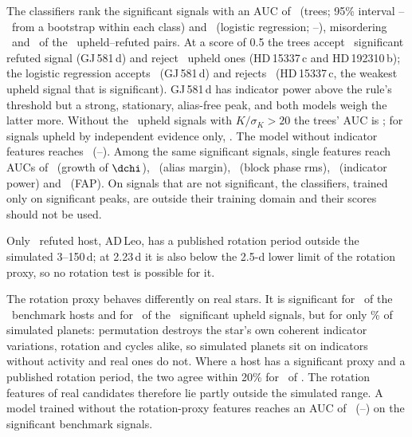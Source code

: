 The classifiers rank the significant signals with an AUC of \nmBAucTree\ (trees; 95\%
interval \nmBAucTreeLo--\nmBAucTreeHi\ from a bootstrap within each class) and
\nmBAucLog\ (logistic regression; \nmBAucLogLo--\nmBAucLogHi), misordering \nmBMisTree\
and \nmBMisLog\ of the \nmBPairs\ upheld--refuted pairs. At a score of 0.5 the trees
accept \nmBTreeRefAcc\ significant refuted signal (GJ\,581\,d) and reject
\nmBTreeUpRej\ upheld ones (HD\,15337\,c and HD\,192310\,b); the logistic regression accepts
\nmBLogRefAcc\ (GJ\,581\,d) and rejects \nmBLogUpRej\ (HD\,15337\,c, the weakest upheld signal
that is significant).
GJ\,581\,d has indicator power above the rule's threshold but a strong, stationary,
alias-free peak, and both models weigh the latter more. Without the \nmBEasyN\ upheld
signals with $K/\sigma_K > 20$ the trees' AUC is \nmBAucTreeNoEasy; for signals upheld by
independent evidence only, \nmBAucTreeUI. The model without indicator features reaches
\nmBAucNoInd\ (\nmBAucNoIndLo--\nmBAucNoIndHi). Among the same significant signals,
single features reach AUCs of \nmBSingleGrowth\ (growth of $\dchi$), \nmBSingleAlias\
(alias margin), \nmBSingleBlockRms\ (block phase rms), \nmBSingleInd\ (indicator power)
and \nmBSingleFap\ (FAP). On signals that are not significant, the classifiers, trained
only on significant peaks, are outside their training domain and their scores should
not be used.

Only \nmRefOutsideProt\ refuted host, AD\,Leo, has a published rotation period outside the
simulated 3--150\,d; at 2.23\,d it is also below the 2.5-d lower limit of the rotation
proxy, so no rotation test is possible for it.

The rotation proxy behaves differently on real stars. It is significant for
\nmProxyHostsN\ of the \nmNHosts\ benchmark hosts and for \nmProxyUpSigN\ of the
\nmBRuleUpN\ significant upheld signals, but for only \nmProxyPlanetPct\% of simulated
planets: permutation destroys the star's own coherent indicator variations, rotation and
cycles alike, so simulated planets sit on indicators without activity and real ones do
not. Where a host has a significant proxy and a published rotation period, the two agree
within 20\% for \nmProxyAgreeN\ of \nmProxyCmpN. The rotation features of real candidates
therefore lie partly outside the simulated range. A model trained
without the rotation-proxy features reaches an AUC of \nmBAucNoProxy\
(\nmBAucNoProxyLo--\nmBAucNoProxyHi) on the significant benchmark signals.

